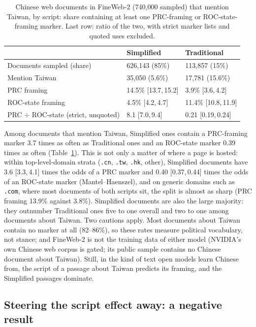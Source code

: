\documentclass[11pt,a4paper]{article}
\newcommand{\ci}[2]{{\scriptsize[#1,\,#2]}}
\begin{document}
\begin{table}[t]
\centering\small
\caption{Chinese web documents in FineWeb-2 (740,000 sampled) that mention Taiwan, by script: share containing at least
one PRC-framing or ROC-state-framing marker. Last row: ratio of the two, with strict marker lists and quoted uses
excluded.}
\label{tab:corpus}
\begin{tabular}{@{}lll@{}}
\toprule
& Simplified & Traditional \\
\midrule
Documents sampled (share) & 626,143 (85\%) & 113,857 (15\%) \\
Mention Taiwan & 35,050 (5.6\%) & 17,781 (15.6\%) \\
PRC framing & 14.5\% \ci{13.7}{15.2} & 3.9\% \ci{3.6}{4.2} \\
ROC-state framing & 4.5\% \ci{4.2}{4.7} & 11.4\% \ci{10.8}{11.9} \\
PRC $\div$ ROC-state (strict, unquoted) & 8.1 \ci{7.0}{9.4} & 0.21 \ci{0.19}{0.24} \\
\bottomrule
\end{tabular}
\end{table}

Among documents that mention Taiwan, Simplified ones contain a PRC-framing marker 3.7 times as often as Traditional
ones and an ROC-state marker 0.39 times as often (Table~\ref{tab:corpus}). This is not only a matter of where a page is
hosted: within top-level-domain strata (\texttt{.cn}, \texttt{.tw}, \texttt{.hk}, other), Simplified documents have 3.6
\ci{3.3}{4.1} times the odds of a PRC marker and 0.40 \ci{0.37}{0.44} times the odds of an ROC-state marker
(Mantel--Haenszel), and on generic domains such as \texttt{.com}, where most documents of both scripts sit, the split is
almost as sharp (PRC framing 13.9\% against 3.8\%). Simplified documents are also the large majority: they outnumber
Traditional ones five to one overall and two to one among documents about Taiwan. Two cautions apply. Most documents
about Taiwan contain no marker at all (82--86\%), so these rates measure political vocabulary, not stance; and FineWeb-2
is not the training data of either model (NVIDIA's own Chinese web corpus is gated; its public sample contains no
Chinese document about Taiwan). Still, in the kind of text open models learn Chinese from, the script of a passage about Taiwan
predicts its framing, and the Simplified passages dominate.

\subsection{Steering the script effect away: a negative result}\label{sec:steer}
\end{document}
